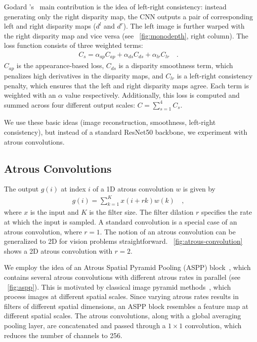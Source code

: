 Godard \etal's~\cite{Godard_2017_CVPR} main contribution is the idea of left-right consistency: instead generating only the right disparity map, the CNN outputs a pair of corresponding left and right disparity maps ($d^l$ and $d^r$).
The left image is further warped with the right disparity map and vice versa (see \figurename~\ref{fig:monodepth}, right column).
The loss function consists of three weighted terms:
\begin{align}
    C_s = \alpha_{ap}C_{ap} + \alpha_{ds}C_{ds} + \alpha_{lr}C_{lr} \quad .
\end{align}
$C_{ap}$ is the appearance-based loss, $C_{ds}$ is a disparity smoothness term, which penalizes high derivatives in the disparity maps, and $C_{lr}$ is a left-right consistency penalty, which ensures that the left and right disparity maps agree.
Each term is weighted with an $\alpha$ value respectively.
Additionally, this loss is computed and summed across four different output scales: $C = \sum_{s=1}^4 C_s$.

We use these basic ideas (image reconstruction, smoothness, left-right consistency), but instead of a standard ResNet50 backbone, we experiment with atrous convolutions.


\subsection{Atrous Convolutions}
The output $g(i)$ at index  $i$ of a 1D atrous convolution $w$ is given by
\begin{align}
    g(i) = \sum_{k=1}^K x(i + rk) w(k) \quad ,
\end{align}
where $x$ is the input and $K$ is the filter size. The filter dilation $r$ specifies the rate at which the input is sampled. A standard convolution is a special case of an atrous convolution, where $r = 1$. 
The notion of an atrous convolution can be generalized to 2D for vision problems straightforward. \figurename~\ref{fig:atrous-convolution} shows a 2D atrous convolution with $r=2$.

We employ the idea of an Atrous Spatial Pyramid Pooling (ASPP) block~\cite{chen2018deeplab}, which contains several atrous convolutions with different atrous rates in parallel (see \figurename~\ref{fig:aspp}).
This is motivated by classical image pyramid methods~\cite{Witkin1987,quam1987hierarchical}, which process images at different spatial scales. 
Since varying atrous rates results in filters of different spatial dimensions, an ASPP block resembles a feature map at different spatial scales.
The atrous convolutions, along with a global averaging pooling layer, are concatenated and passed through a $1 \times 1$ convolution, which reduces the number of channels to 256.

